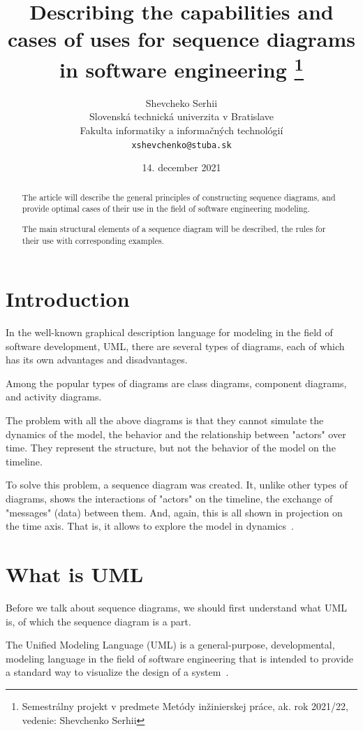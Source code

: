 \documentclass[10pt, twoside, slovak,a4paper]{article}
\title{Describing the capabilities and cases of uses for sequence diagrams in software engineering \thanks{Semestrálny projekt v predmete Metódy inžinierskej práce, ak. rok 2021/22, vedenie: Shevchenko Serhii}} %
\author{Shevcheko Serhii\\[2pt]
	{\small Slovenská technická univerzita v Bratislave}\\
	{\small Fakulta informatiky a informačných technológií}\\
	{\small \texttt{xshevchenko@stuba.sk}}
	}
\date{\small 14. december 2021}
\begin{document}
\maketitle

\begin{abstract}
The article will describe the general principles of constructing sequence diagrams, and provide optimal cases of their use in the field of software engineering modeling.

The main structural elements of a sequence diagram will be described, the rules for their use with corresponding examples.
\end{abstract}



\section{Introduction}

In the well-known graphical description language for modeling in the field of software development, UML, there are several types of diagrams, each of which has its own advantages and disadvantages.

Among the popular types of diagrams are class diagrams, component diagrams, and activity diagrams.

The problem with all the above diagrams is that they cannot simulate the dynamics of the model, the behavior and the relationship between "actors" over time. They represent the structure, but not the behavior of the model on the timeline.

To solve this problem, a sequence diagram was created. It, unlike other types of diagrams, shows the interactions of "actors" on the timeline, the exchange of "messages" (data) between them. And, again, this is all shown in projection on the time axis. That is, it allows to explore the model in dynamics~\cite{Sequence_diagram:Lambert}.

\section{What is UML} \label{what_is_diagram}

Before we talk about sequence diagrams, we should first understand what UML is, of which the sequence diagram is a part.

The Unified Modeling Language (UML) is a general-purpose, developmental, modeling language in the field of software engineering that is intended to provide a standard way to visualize the design of a system~\cite{UML_Distilled}. 
\end{document}
